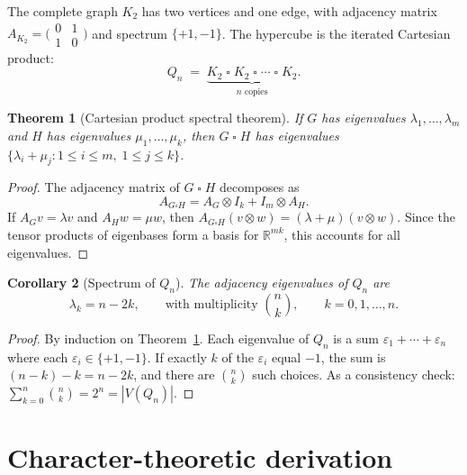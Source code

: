 \documentclass[11pt,a4paper]{article}
\theoremstyle{plain}
\newtheorem{theorem}{Theorem}
\newtheorem{corollary}[theorem]{Corollary}
\theoremstyle{definition}
\theoremstyle{remark}
\newcommand{\R}{\mathbb{R}}
\begin{document}
The complete graph $K_2$ has two vertices and one edge, with adjacency
matrix $A_{K_2} = \bigl(\begin{smallmatrix} 0 & 1 \\ 1 & 0 \end{smallmatrix}\bigr)$
and spectrum $\{+1, -1\}$. The hypercube is the iterated Cartesian product:
\[
  Q_n \;=\; \underbrace{K_2 \mathbin{\square} K_2 \mathbin{\square}
    \cdots \mathbin{\square} K_2}_{n \text{ copies}}.
\]

\begin{theorem}[Cartesian product spectral theorem]
\label{thm:cart-spec}
If $G$ has eigenvalues $\lambda_1, \ldots, \lambda_m$ and $H$ has
eigenvalues $\mu_1, \ldots, \mu_k$, then $G \mathbin{\square} H$ has
eigenvalues $\{\lambda_i + \mu_j : 1 \le i \le m,\; 1 \le j \le k\}$.
\end{theorem}

\begin{proof}
The adjacency matrix of $G \mathbin{\square} H$ decomposes as
\[
  A_{G \square H} = A_G \otimes I_k + I_m \otimes A_H.
\]
If $A_G v = \lambda v$ and $A_H w = \mu w$, then
$A_{G \square H}(v \otimes w) = (\lambda + \mu)(v \otimes w)$.
Since the tensor products of eigenbases form a basis for $\R^{mk}$,
this accounts for all eigenvalues.
\end{proof}

\begin{corollary}[Spectrum of $Q_n$]
\label{cor:hypercube-spec}
The adjacency eigenvalues of $Q_n$ are
\[
  \lambda_k = n - 2k, \qquad
  \text{with multiplicity } \binom{n}{k}, \qquad
  k = 0, 1, \ldots, n.
\]
\end{corollary}

\begin{proof}
By induction on Theorem~\ref{thm:cart-spec}. Each eigenvalue of $Q_n$ is a
sum $\varepsilon_1 + \cdots + \varepsilon_n$ where each
$\varepsilon_i \in \{+1, -1\}$. If exactly $k$ of the $\varepsilon_i$ equal
$-1$, the sum is $(n-k) - k = n - 2k$, and there are $\binom{n}{k}$ such
choices. As a consistency check: $\sum_{k=0}^n \binom{n}{k} = 2^n = |V(Q_n)|$.
\end{proof}


\section{Character-theoretic derivation}
\end{document}
